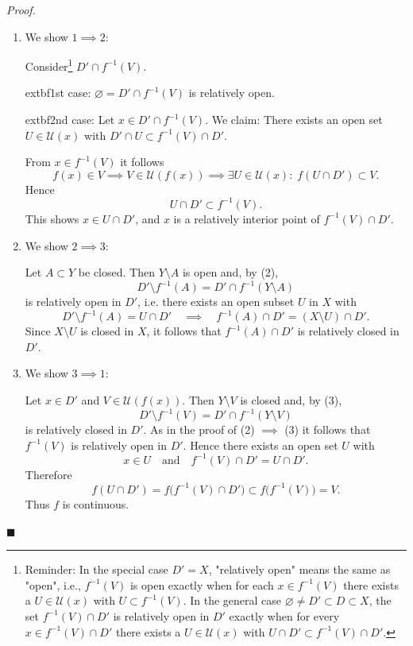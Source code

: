 \documentclass[12pt]{article}
\begin{document}
\emph{Proof.}
\begin{enumerate}[label=\alph*)]
	\item We show $1 \implies 2$:
  
	Consider\footnote{Reminder: In the special case $D' = X$, "relatively open" means the same as "open", i.e., $f^{-1}(V)$ is open exactly when for each $x \in f^{-1}(V)$ there exists a $U \in \mathcal U(x)$ with $U \subset f^{-1}(V)$. In the general case $\varnothing \ne D' \subset D \subset X$, the set $f^{-1}(V)\cap D'$ is relatively open in $D'$ exactly when for every $x \in f^{-1}(V)\cap D'$ there exists a $U \in \mathcal U(x)$ with $U \cap D' \subset f^{-1}(V)\cap D'$.} $D' \cap f^{-1}(V)$.
  
		extbf{1st case:} $\varnothing = D' \cap f^{-1}(V)$ is relatively open.
  
		extbf{2nd case:} Let $x \in D' \cap f^{-1}(V)$. We claim: There exists an open set $U \in \mathcal U(x)$ with $D' \cap U \subset f^{-1}(V) \cap D'$.
  
	From $x \in f^{-1}(V)$ it follows
	\[
		f(x) \in V \implies V \in \mathcal U(f(x)) \implies \exists U \in \mathcal U(x): \; f(U \cap D') \subset V.
	\]
	Hence
	\[
		U \cap D' \subset f^{-1}(V).
	\]
	This shows $x \in U \cap D'$, and $x$ is a relatively interior point of $f^{-1}(V) \cap D'$.
  
	\item We show $2 \implies 3$:
  
	Let $A \subset Y$ be closed. Then $Y\setminus A$ is open and, by (2),
	\[
		D' \setminus f^{-1}(A) = D' \cap f^{-1}(Y\setminus A)
	\]
	is relatively open in $D'$, i.e. there exists an open subset $U$ in $X$ with
	\[
		D' \setminus f^{-1}(A) = U \cap D' \quad \implies \quad f^{-1}(A) \cap D' = (X\setminus U) \cap D'.
	\]
	Since $X\setminus U$ is closed in $X$, it follows that $f^{-1}(A) \cap D'$ is relatively closed in $D'$.
  
	\item We show $3 \implies 1$:
  
	Let $x \in D'$ and $V \in \mathcal U(f(x))$. Then $Y\setminus V$ is closed and, by (3),
	\[
		D' \setminus f^{-1}(V) = D' \cap f^{-1}(Y\setminus V)
	\]
	is relatively closed in $D'$. As in the proof of (2) $\implies$ (3) it follows that $f^{-1}(V)$ is relatively open in $D'$. Hence there exists an open set $U$ with
	\[
		x \in U \quad \text{and} \quad f^{-1}(V) \cap D' = U \cap D'.
	\]
	Therefore
	\[
		f(U \cap D') = f\bigl(f^{-1}(V) \cap D'\bigr) \subset f\bigl(f^{-1}(V)\bigr) = V.
	\]
	Thus $f$ is continuous.
\end{enumerate}
\hfill $\blacksquare$
\end{document}
